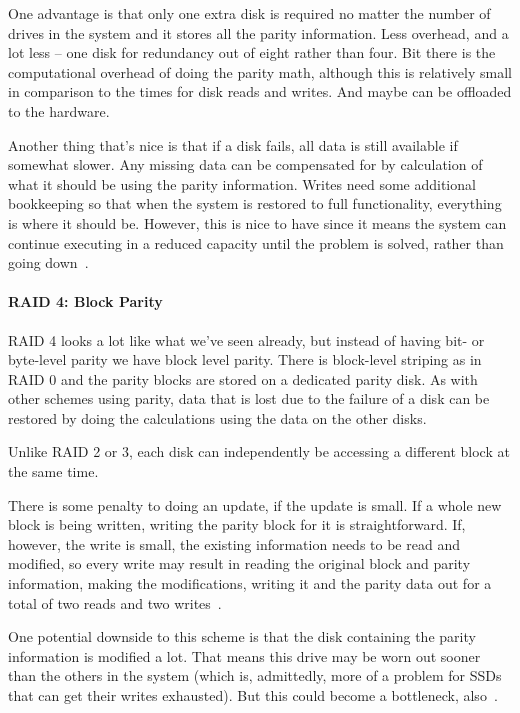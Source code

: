 One advantage is that only one extra disk is required no matter the number of drives in the system and it stores all the parity information. Less overhead, and a lot less -- one disk for redundancy out of eight rather than four. Bit there is the computational overhead of doing the parity math, although this is relatively small in comparison to the times for disk reads and writes. And maybe can be offloaded to the hardware.

Another thing that's nice is that if a disk fails, all data is still available if somewhat slower. Any missing data can be compensated for by calculation of what it should be using the parity information. Writes need some additional bookkeeping so that when the system is restored to full functionality, everything is where it should be. However, this is nice to have since it means the system can continue executing in a reduced capacity until the problem is solved, rather than going down~\cite{osi}.

\paragraph{RAID 4: Block Parity}
RAID 4 looks a lot like what we've seen already, but instead of having bit- or byte-level parity we have block level parity. There is block-level striping as in RAID 0 and the parity blocks are stored on a dedicated parity disk. As with other schemes using parity, data that is lost due to the failure of a disk can be restored by doing the calculations using the data on the other disks.

Unlike RAID 2 or 3, each disk can independently be accessing a different block at the same time. 

There is some penalty to doing an update, if the update is small. If a whole new block is being written, writing the parity block for it is straightforward. If, however, the write is small, the existing information needs to be read and modified, so every write may result in reading the original block and parity information, making the modifications, writing it and the parity data out for a total of two reads and two writes~\cite{osi}.

One potential downside to this scheme is that the disk containing the parity information is modified a lot. That means this drive may be worn out sooner than the others in the system (which is, admittedly, more of a problem for SSDs that can get their writes exhausted). But this could become a bottleneck, also~\cite{osi}.

